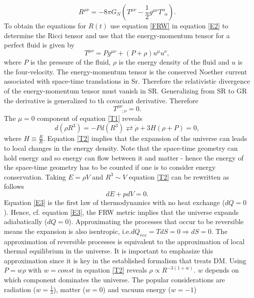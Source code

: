 \begin{equation}
	R^{\mu\nu}=-8\pi G_N(T^{\mu\nu}-\frac{1}{2}g^{\mu\nu}T^{\alpha}_{\,\,\,\alpha}).
	\label{E2}
\end{equation}  
To obtain the equations for $R(t)$ use equation \eqref{FRW} in equation \eqref{E2} to determine the Ricci tensor and use that the energy-momentum tensor for a perfect fluid is given by
\begin{equation}
	T^{\mu\nu}=Pg^{\mu\nu}+(P+\rho)u^\mu u^\nu,
\end{equation} 
where $P$ is the pressure of the fluid, $\rho$ is the energy density of the fluid and $u$ is the four-velocity. The energy-momentum tensor is the conserved Noether current associated with space-time translations in Sr. Therefore the relativistic divergence of the energy-momentum tensor must vanish in SR. Generalizing from SR to GR the derivative is generalized to th covariant derivative. Therefore
\begin{equation}
	T^{\mu\nu}_{\,\,\,\,\,\, ; \nu}=0.
	\label{T1}
\end{equation} 
The $\mu=0$ component of equation \eqref{T1} reveals
\begin{equation}
	d(\rho R^3)=-Pd(R^3)\rightleftarrows \dot{\rho}+3H(\rho +P)=0,
	\label{T2}
\end{equation}  
where $H\equiv \frac{\dot{R}}{R}$. Equation \eqref{T2} implies that the expansion of the universe can leads to local changes in the energy density. Note that the space-time geometry can hold energy and so energy can flow between it and matter - hence the energy of the space-time geometry has to be counted if one is to consider energy conservation. Taking $E=\rho V$ and $R^3\sim V$ equation \eqref{T2} can be rewritten as follows
\begin{equation}
	dE+pdV=0.
	\label{E3}
\end{equation} 
Equation \eqref{E3} is the first law of thermodynamics with no heat exchange ($dQ=0$). Hence, cf. equation \eqref{E3}, the FRW metric implies that the universe expands adiabatically ($dQ=0$). Approximating the processes that occur to be reversible means the expansion is also isentropic, i.e.$dQ_{rev}=TdS=0\Rightarrow dS=0$. The approximation of reversible processes is equivalent to the approximation of local thermal equilibrium in the universe. It is important to emphasize this approximation since it is key in the established formalism that treats DM.\newline
Using $P=w\rho$ with $w=const$ in equation \eqref{T2} reveals $\rho\propto R^{-3(1+w)}$. $w$ depends on which component dominates the universe. The popular considerations are radiation ($w=\frac{1}{3}$), matter ($w=0$) and vacuum energy ($w=-1$)
